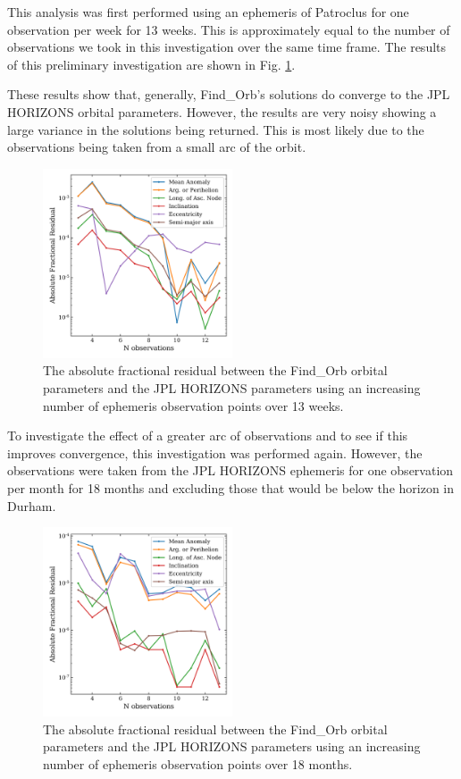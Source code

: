 \documentclass[10pt, twocolumn]{revtex4}    %
\begin{document}
This analysis was first performed using an ephemeris of Patroclus for one observation per week for 13 weeks. This is approximately equal to the number of observations we took in this investigation over the same time frame. The results of this preliminary investigation are shown in Fig. \ref{fig: JPL-find orb convergence}.

These results show that, generally, Find\_Orb's solutions do converge to the JPL HORIZONS orbital parameters. However, the results are very noisy showing a large variance in the solutions being returned. This is most likely due to the observations being taken from a small arc of the orbit.

\begin{figure}[h!]
\centering
\includegraphics[width=0.5\textwidth]{20180424_205752_JPL_FINDORB_CONVERGENCE}
\caption{The absolute fractional residual between the Find\_Orb orbital parameters and the JPL HORIZONS parameters using an increasing number of ephemeris observation points over 13 weeks.}
\label{fig: JPL-find orb convergence}
\end{figure}

To investigate the effect of a greater arc of observations and to see if this improves convergence, this investigation was performed again. However, the observations were taken from the JPL HORIZONS ephemeris for one observation per month for 18 months and excluding those that would be below the horizon in Durham.
\begin{figure}[h!]
\centering
\includegraphics[width=0.5\textwidth]{20180424_205806_JPL_FINDORB_CONVERGENCE}
\caption{The absolute fractional residual between the Find\_Orb orbital parameters and the JPL HORIZONS parameters using an increasing number of ephemeris observation points over 18 months.}
\label{fig: JPL-find orb convergence 18mth}
\end{figure}
\end{document}
